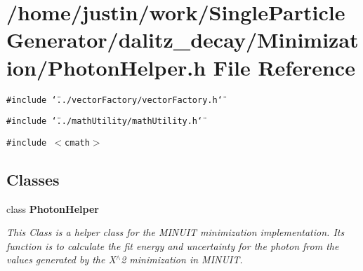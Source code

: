 \section{/home/justin/work/Single\-Particle\-Generator/dalitz\_\-decay/Minimization/Photon\-Helper.h File Reference}
\label{PhotonHelper_8h}
{\tt \#include \char`\"{}../vector\-Factory/vector\-Factory.h\char`\"{}}\par
{\tt \#include \char`\"{}../math\-Utility/math\-Utility.h\char`\"{}}\par
{\tt \#include $<$cmath$>$}\par
\subsection*{Classes}
\begin{CompactItemize}
\item 
class \bf{Photon\-Helper}
\begin{CompactList}\small\item\em This Class is a helper class for the MINUIT minimization implementation. Its function is to calculate the fit energy and uncertainty for the photon from the values generated by the X$^\wedge$2 minimization in MINUIT. \item\end{CompactList}\end{CompactItemize}
